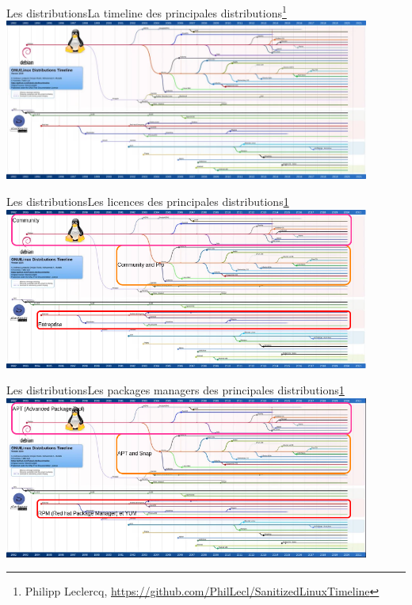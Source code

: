 \documentclass{beamer}
\begin{document}
    \begin{frame}{Les distributions}{La timeline des principales distributions\footnote{\label{main-distro}Philipp Leclercq, \url{https://github.com/PhilLecl/SanitizedLinuxTimeline}}}
        \centering
        \includegraphics[width=12cm]{image/linux-main-distro-timeline}
    \end{frame}

    \begin{frame}{Les distributions}{Les licences des principales distributions\cref{main-distro}}
        \centering
        \includegraphics[width=12cm]{image/main-distro-license.drawio}
    \end{frame}

    \begin{frame}{Les distributions}{Les packages managers des principales distributions\cref{main-distro}}
        \centering
        \includegraphics[width=12cm]{image/main-distro-package-manager.drawio}
    \end{frame}
\end{document}
